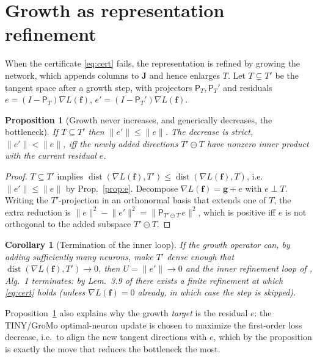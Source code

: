 \documentclass[conference]{IEEEtran}
\newtheorem{proposition}{Proposition}
\newtheorem{corollary}{Corollary}
\theoremstyle{remark}
\newcommand{\norm}[1]{\lVert #1\rVert}
\newcommand{\grad}{\nabla}
\newcommand{\PT}{\mathsf{P}_{T}}
\newcommand{\J}{\mathbf{J}}
\newcommand{\f}{\bm{f}}
\newcommand{\g}{\bm{g}}
\begin{document}
\section{Growth as representation refinement}
When the certificate \eqref{eq:cert} fails, the representation is refined by
growing the network, which appends columns to $\J$ and hence enlarges $T$. Let
$T\subsetneq T'$ be the tangent space after a growth step, with projectors
$\PT,\PT'$ and residuals $e=(I-\PT)\grad L(\f)$, $e'=(I-\PT')\grad L(\f)$.

\begin{proposition}[Growth never increases, and generically decreases, the bottleneck]
\label{prop:growth}
If $T\subseteq T'$ then $\norm{e'}\le\norm{e}$. The decrease is strict,
$\norm{e'}<\norm{e}$, iff the newly added directions $T'\ominus T$ have nonzero
inner product with the current residual $e$.
\end{proposition}
\begin{proof}
$T\subseteq T'$ implies $\operatorname{dist}(\grad L(\f),T')\le
\operatorname{dist}(\grad L(\f),T)$, i.e.\ $\norm{e'}\le\norm{e}$ by
Prop.~\ref{prop:e}. Decompose $\grad L(\f)=\g+e$ with $e\perp T$. Writing the
$T'$-projection in an orthonormal basis that extends one of $T$, the extra
reduction is $\norm{e}^2-\norm{e'}^2=\norm{\mathsf P_{T'\ominus T}\,e}^2$, which is
positive iff $e$ is not orthogonal to the added subspace $T'\ominus T$.
\end{proof}

\begin{corollary}[Termination of the inner loop]\label{cor:term}
If the growth operator can, by adding sufficiently many neurons, make $T'$ dense
enough that $\operatorname{dist}(\grad L(\f),T')\to0$, then $U=\norm{e'}\to0$ and
the inner refinement loop of \cite{fgd}, Alg.~1 terminates: by Lem.~3.9 of
\cite{fgd} there exists a finite refinement at which \eqref{eq:cert} holds (unless
$\grad L(\f)=0$ already, in which case the step is skipped).
\end{corollary}

Proposition~\ref{prop:growth} also explains why the growth \emph{target} is the
residual $e$: the TINY/GroMo optimal-neuron update is chosen to maximize the
first-order loss decrease, i.e.\ to align the new tangent directions with $e$,
which by the proposition is exactly the move that reduces the bottleneck the most.
\end{document}
